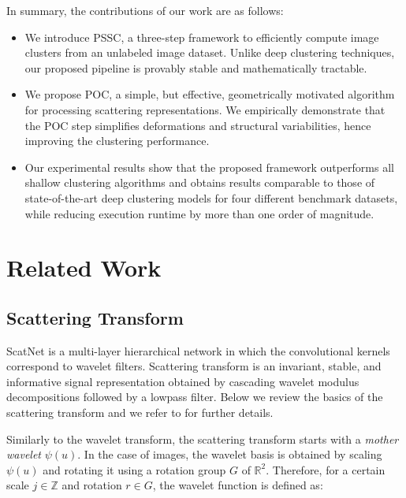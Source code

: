 \documentclass[11pt]{article}
\theoremstyle{definition}
\newcommand{\MotherWavelet}{\psi}
\newcommand{\RotationGroup}{G}
\begin{document}
In summary, the contributions of our work are as follows:

\begin{itemize}
	\item We introduce PSSC, a three-step framework to efficiently compute image clusters from an unlabeled image dataset. Unlike deep clustering techniques, our proposed pipeline is provably stable and mathematically tractable.
	
	\item We propose POC, a simple, but effective, geometrically motivated algorithm for processing scattering representations. We empirically demonstrate that the POC step simplifies deformations and structural variabilities, hence improving the clustering performance.
	
	\item Our experimental results show that the proposed framework outperforms all shallow clustering algorithms and obtains results comparable to those of state-of-the-art deep clustering models for four different benchmark datasets, while reducing execution runtime by more than one order of magnitude.
	
	
\end{itemize}




\section{Related Work}\label{sec:related}


\subsection{Scattering Transform}\label{sec:scattering}

ScatNet \cite{Mallat_GroupInvariantScattering_2012, Bruna_InvariantScattering_2012} is a multi-layer hierarchical network in which the convolutional kernels correspond to wavelet filters. Scattering transform is an invariant, stable, and informative signal representation obtained by cascading wavelet modulus decompositions followed by a lowpass filter. Below we review the basics of the scattering transform and we refer to \cite{Bruna_InvariantScattering_2012} for further details.

Similarly to the wavelet transform, the scattering transform starts with a \textit{mother wavelet} $\MotherWavelet(u)$. In the case of images, the wavelet basis is obtained by scaling $\MotherWavelet(u)$ and rotating it using a rotation group $\RotationGroup$ of $\mathbb{R}^2$. Therefore, for a certain scale $ j \in \mathbb{Z}$ and rotation $r \in \RotationGroup$, the wavelet function is defined as:
\end{document}
